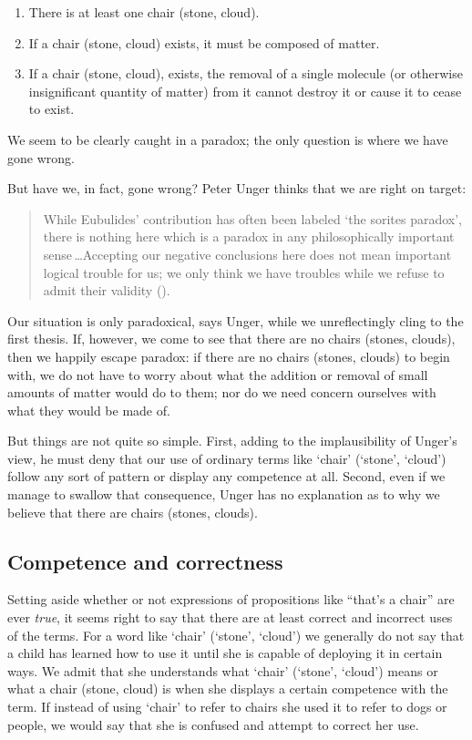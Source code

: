 \documentclass[11pt]{article}
\newenvironment{squote}{%
	\begin{quote}\begin{singlespace}%
	}{%
	\end{singlespace}\end{quote}}
\begin{document}
\begin{spacing}{1.5}
\begin{enumerate}
  \item There is at least one chair (stone, cloud).
  \item If a chair (stone, cloud) exists, it must be composed of
    matter.
  \item If a chair (stone, cloud), exists, the removal of a single
    molecule (or otherwise insignificant quantity of matter) from it
    cannot destroy it or cause it to cease to exist.
\end{enumerate}

We seem to be clearly caught in a paradox; the only question is where
we have gone wrong.

But have we, in fact, gone wrong?  Peter Unger thinks that we are
right on target:

\begin{squote}
While Eubulides' contribution has often been labeled `the sorites
paradox', there is nothing here which is a paradox in any
philosophically important sense\,\ldots Accepting our negative
conclusions here does not mean important logical trouble for us; we
only think we have troubles while we refuse to admit their validity
(\citeyear[145]{unger1979}).
\end{squote}

Our situation is only paradoxical, says Unger, while we unreflectingly
cling to the first thesis.  If, however, we come to see that there are
no chairs (stones, clouds), then we happily escape paradox: if there
are no chairs (stones, clouds) to begin with, we do not have to worry
about what the addition or removal of small amounts of matter would do
to them; nor do we need concern ourselves with what they would be made
of.

But things are not quite so simple.  First, adding to the
implausibility of Unger's view, he must deny that our use of ordinary
terms like `chair' (`stone', `cloud') follow any sort of pattern or
display any competence at all.  Second, even if we manage to swallow
that consequence, Unger has no explanation as to why we believe that
there are chairs (stones, clouds).

\subsection{Competence and correctness}
\label{comp}
Setting aside whether or not expressions of propositions like ``that's
a chair'' are ever \emph{true}, it seems right to say that there are
at least correct and incorrect uses of the terms.  For a word like
`chair' (`stone', `cloud') we generally do not say that a child has
learned how to use it until she is capable of deploying it in certain
ways.  We admit that she understands what `chair' (`stone', `cloud')
means or what a chair (stone, cloud) is when she displays a certain
competence with the term.  If instead of using `chair' to refer to
chairs she used it to refer to dogs or people, we would say that she
is confused and attempt to correct her use.


\end{spacing}
\end{document}

